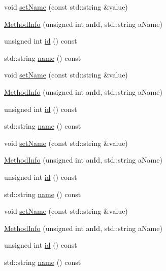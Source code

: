 \begin{DoxyCompactItemize}
void \mbox{\hyperlink{structfakeit_1_1MethodInfo_a77e8fe8e88ba1c84dfa8d45d74b5e854}{set\+Name}} (const std\+::string \&value)
\item 
\mbox{\hyperlink{structfakeit_1_1MethodInfo_a55bde4b21f0b316f2f01d7e76cee5890}{Method\+Info}} (unsigned int an\+Id, std\+::string a\+Name)
\item 
unsigned int \mbox{\hyperlink{structfakeit_1_1MethodInfo_a013ce0b5f78a9ca29bfb383d49cefb2a}{id}} () const
\item 
std\+::string \mbox{\hyperlink{structfakeit_1_1MethodInfo_ab27987f3bbd7fee8e4762323b333cb27}{name}} () const
\item 
void \mbox{\hyperlink{structfakeit_1_1MethodInfo_a77e8fe8e88ba1c84dfa8d45d74b5e854}{set\+Name}} (const std\+::string \&value)
\item 
\mbox{\hyperlink{structfakeit_1_1MethodInfo_a55bde4b21f0b316f2f01d7e76cee5890}{Method\+Info}} (unsigned int an\+Id, std\+::string a\+Name)
\item 
unsigned int \mbox{\hyperlink{structfakeit_1_1MethodInfo_a013ce0b5f78a9ca29bfb383d49cefb2a}{id}} () const
\item 
std\+::string \mbox{\hyperlink{structfakeit_1_1MethodInfo_ab27987f3bbd7fee8e4762323b333cb27}{name}} () const
\item 
void \mbox{\hyperlink{structfakeit_1_1MethodInfo_a77e8fe8e88ba1c84dfa8d45d74b5e854}{set\+Name}} (const std\+::string \&value)
\item 
\mbox{\hyperlink{structfakeit_1_1MethodInfo_a55bde4b21f0b316f2f01d7e76cee5890}{Method\+Info}} (unsigned int an\+Id, std\+::string a\+Name)
\item 
unsigned int \mbox{\hyperlink{structfakeit_1_1MethodInfo_a013ce0b5f78a9ca29bfb383d49cefb2a}{id}} () const
\item 
std\+::string \mbox{\hyperlink{structfakeit_1_1MethodInfo_ab27987f3bbd7fee8e4762323b333cb27}{name}} () const
\item 
void \mbox{\hyperlink{structfakeit_1_1MethodInfo_a77e8fe8e88ba1c84dfa8d45d74b5e854}{set\+Name}} (const std\+::string \&value)
\item 
\mbox{\hyperlink{structfakeit_1_1MethodInfo_a55bde4b21f0b316f2f01d7e76cee5890}{Method\+Info}} (unsigned int an\+Id, std\+::string a\+Name)
\item 
unsigned int \mbox{\hyperlink{structfakeit_1_1MethodInfo_a013ce0b5f78a9ca29bfb383d49cefb2a}{id}} () const
\item 
std\+::string \mbox{\hyperlink{structfakeit_1_1MethodInfo_ab27987f3bbd7fee8e4762323b333cb27}{name}} () const

\end{DoxyCompactItemize}
